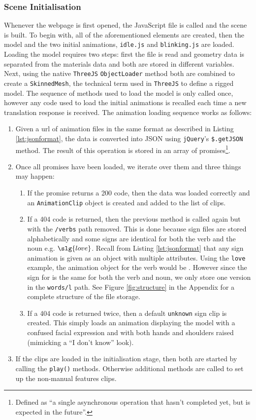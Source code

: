 \documentclass[12pt]{ociamthesis}  %
\newcommand{\tech}{\texttt}
\begin{document}
\subsubsection{Scene Initialisation}
Whenever the webpage is first opened, the JavaScript file is called and the scene is built. To begin with, all of the aforementioned elements are created, then the model and the two initial animations, \texttt{idle.js} and \texttt{blinking.js}  are loaded. Loading the model requires two steps: first the file is read and geometry data is separated from the materials data and both are stored in different variables. Next, using the native \texttt{ThreeJS} \texttt{ObjectLoader} method both are combined to create a \texttt{SkinnedMesh}, the technical term used in \tech{ThreeJS} to define a rigged model. The sequence of methods used to load the model is only called once, however any code used to load the initial animations is recalled each time a new translation response is received. The animation loading sequence works as follows:
\begin{enumerate}
	\item Given a url of animation files in the same format as described in Listing \ref{lst:jsonformat}, the data is converted into JSON using \texttt{jQuery}'s \texttt{\$.getJSON} method. The result of this operation is stored in an array of promises\footnote{Defined as ``a single asynchronous operation that hasn't completed yet, but is expected in the future''.}.
	\item Once all promises have been loaded, we iterate over them and three things may happen:
		\begin{enumerate}
			\item If the promise returns a 200 code, then the data was loaded correctly and an \texttt{AnimationClip} object is created and added to the list of clips.
			\item If a 404 code is returned, then the previous method is called again but with the \texttt{/verbs} path removed. This is done because sign files are stored alphabetically and some signs are identical for both the verb and the noun e.g. $\slg{love}$. Recall from Listing \ref{lst:jsonformat} that any sign animation is given as an object with multiple attributes. Using the \texttt{love} example, the animation object for the verb would be  \texttt{}. However since the sign for  is the same for both the verb and noun, we only store one version in the \texttt{words/l} path. See Figure \ref{fig:structure} in the Appendix for a complete structure of the file storage.
			\item If a 404 code is returned twice, then a default \texttt{unknown} sign clip is created. This simply loads an animation displaying the model with a confused facial expression and with both hands and shoulders raised (mimicking a ``I don't know'' look). 
		\end{enumerate}
	\item If the clips are loaded in the initialisation stage, then both are started by calling the \texttt{play()} methods. Otherwise additional methods are called to set up the non-manual features clips.
\end{enumerate}
\end{document}
